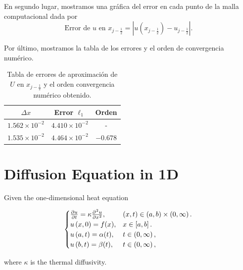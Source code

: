 En segundo lugar, mostramos una gráfica del error en cada punto de la malla computacional
dada por
\begin{equation*}
    \text{Error de $u$ en $x_{j-\frac{1}{2}}$}=
    \left|
    u\left(x_{j-\frac{1}{2}}\right)-
    u_{j-\frac{1}{2}}
    \right|.
\end{equation*}

Por último, mostramos la tabla de los errores y el orden de convergencia numérico.

\begin{table}[ht!]
    \centering
    \begin{tabular}{ccc}
        \toprule
        $\Delta x$            & Error $\ell_1$        & Orden    \\
        \midrule
        $1.562\times 10^{-2}$ & $4.410\times 10^{-2}$ & -        \\
        $1.535\times 10^{-2}$ & $4.464\times 10^{-2}$ & $-0.678$ \\
        \bottomrule
    \end{tabular}
    \caption{Tabla de errores de aproximación de $U$ en
        $x_{j-\frac{1}{2}}$ y el orden convergencia numérico obtenido.}
    \label{table:errors}
\end{table}


\section{Diffusion Equation in 1D}

Given the one-dimensional heat equation

\begin{equation}\label{eq:IBVPheat1d}
    \begin{cases}
        \diffp{u}{t}=
        \kappa\diffp[2]{u}{x},
                                      & \left(x,t\right)\in
        \left(a,b \right)\times\left(0, \infty \right).     \\
        u\left(x,0\right)=f(x),
                                      & x\in
        \left[a,b\right].                                   \\
        u\left(a,t\right)= \alpha(t), & t\in
        \left(0,\infty\right),                              \\
        u\left(b,t\right)= \beta(t),
                                      & t\in
        \left(0,\infty\right),
    \end{cases}
\end{equation}

where $\kappa$ is the thermal diffusivity.\\

